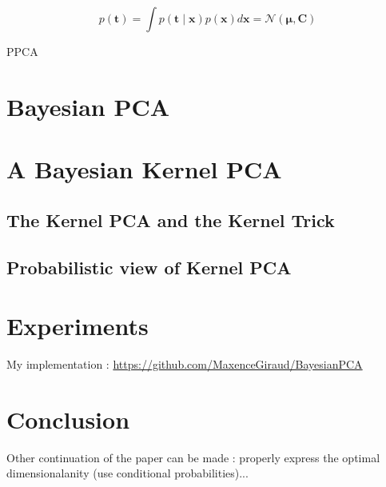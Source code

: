\documentclass{article}
\begin{document}
$$p(\mathbf{t})=\int p(\mathbf{t} \mid \mathbf{x}) p(\mathbf{x}) d \mathbf{x}=\mathcal{N}(\boldsymbol{\mu}, \mathbf{C})$$

PPCA \cite{tipping1999ppca}



\section{Bayesian PCA}


\section{A Bayesian Kernel PCA}

\subsection{The Kernel PCA and the Kernel Trick}

\subsection{Probabilistic view of Kernel PCA}


\section{Experiments}
My implementation : \url{https://github.com/MaxenceGiraud/BayesianPCA} 

\section{Conclusion}

Other continuation of the paper can be made : properly express the optimal dimensionalanity (use conditional probabilities)...


\end{document}
